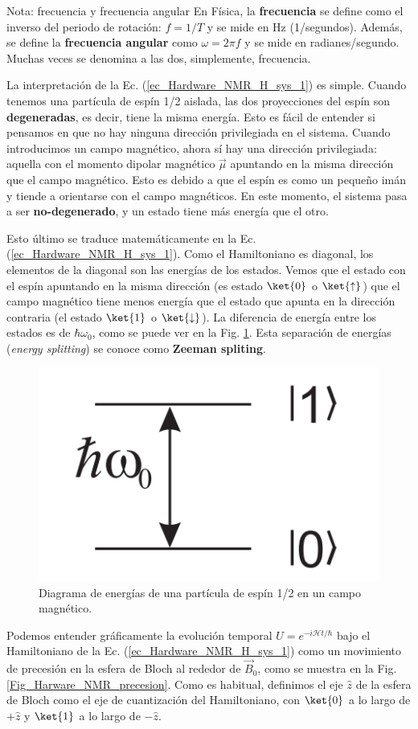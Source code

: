 \documentclass[a4paper,11pt]{book} %
\numberwithin{equation}{chapter}
\begin{document}
\begin{mybox_blue}{Nota: frecuencia y frecuencia angular}
En Física, la \textbf{frecuencia} se define como el inverso del periodo de rotación: $f = 1/T$ y se mide en Hz (1/segundos). Además, se define la \textbf{frecuencia angular} como $\omega = 2\pi f$ y se mide en radianes/segundo. Muchas veces se denomina a las dos, simplemente, frecuencia.
\end{mybox_blue}

La interpretación de la Ec. (\ref{ec_Hardware_NMR_H_sys_1}) es simple. Cuando tenemos una partícula de espín 1/2 aislada, las dos proyecciones del espín son \textbf{degeneradas}, es decir, tiene la misma energía. Esto es fácil de entender si pensamos en que no hay ninguna dirección privilegiada en el sistema. Cuando introducimos un campo magnético, ahora sí hay una dirección privilegiada: aquella con el momento dipolar magnético $\vec{\mu}$ apuntando en la misma dirección que el campo magnético. Esto es debido a que el espín es como un pequeño imán y tiende a orientarse con el campo magnéticos. En este momento, el sistema pasa a ser \textbf{no-degenerado}, y un estado tiene más energía que el otro.

Esto último se traduce matemáticamente en la Ec. (\ref{ec_Hardware_NMR_H_sys_1}). Como el Hamiltoniano es diagonal, los elementos de la diagonal son las energías de los estados. Vemos que el estado con el espín apuntando en la misma dirección (es estado $\ket{0}$ o $\ket{\uparrow}$) que el campo magnético tiene menos energía que el estado que apunta en la dirección contraria (el estado $\ket{1}$ o $\ket{\downarrow}$). La diferencia de energía entre los estados es de $\hbar \omega_0$, como se puede ver en la Fig. \ref{Fig_Harware_NMR_split_Zeeman}. Esta separación de energías (\textit{energy splitting}) se conoce como \textbf{Zeeman spliting}.

	\begin{figure}[H]
	\centering 
	\includegraphics[width=0.15\linewidth]{Figuras/Fig_Harware_NMR_split_Zeeman.png}
	\caption{Diagrama de energías de una partícula de espín 1/2 en un campo magnético.}
	\label{Fig_Harware_NMR_split_Zeeman}
	\end{figure}


Podemos entender gráficamente la evolución temporal $U = e^{-i \mathcal{H} t/ \hbar}$ bajo el Hamiltoniano de la Ec. (\ref{ec_Hardware_NMR_H_sys_1}) como un movimiento de precesión en la esfera de Bloch al rededor de $\vec{B}_0$, como se muestra en la Fig. \ref{Fig_Harware_NMR_precesion}. Como es habitual, definimos el eje $\hat{z}$ de la esfera de Bloch como el eje de cuantización del Hamiltoniano, con $\ket{0}$ a lo largo de $+\hat{z}$ y $\ket{1}$ a lo largo de $-\hat{z}$.
\end{document}
